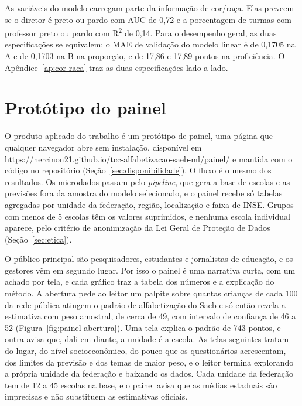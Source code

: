 

As variáveis do modelo carregam parte da informação de cor/raça. Elas
preveem se o diretor é preto ou pardo com AUC de 0,72 e a porcentagem de
turmas com professor preto ou pardo com R\textsuperscript{2} de 0,14. Para o desempenho
geral, as duas especificações se equivalem: o MAE de validação do modelo
linear é de 0,1705 na A e de 0,1703 na B na proporção, e de 17,86 e 17,89
pontos na proficiência. O Apêndice~\ref{ap:cor-raca} traz as duas
especificações lado a lado.

\section{Protótipo do painel}
\label{sec:painel}

O produto aplicado do trabalho é um protótipo de painel, uma página que
qualquer navegador abre sem instalação, disponível em
\url{https://nercinon21.github.io/tcc-alfabetizacao-saeb-ml/painel/} e
mantida com o código no repositório (Seção~\ref{sec:disponibilidade}). O fluxo é o mesmo dos
resultados. Os microdados passam pelo \textit{pipeline}, que gera a base
de escolas e as previsões fora da amostra do modelo selecionado, e o
painel recebe só tabelas agregadas por unidade da federação, região,
localização e faixa de INSE. Grupos com menos de 5 escolas têm os valores
suprimidos, e nenhuma escola individual aparece, pelo critério de
anonimização da Lei Geral de Proteção de Dados (Seção~\ref{sec:etica}).

O público principal são pesquisadores, estudantes e jornalistas de
educação, e os gestores vêm em segundo lugar. Por isso o painel é uma
narrativa curta, com um achado por tela, e cada gráfico traz a tabela dos
números e a explicação do método. A abertura pede ao leitor um palpite
sobre quantas crianças de cada 100 da rede pública atingem o padrão de
alfabetização do Saeb e só então revela a estimativa com peso amostral,
de cerca de 49, com intervalo de confiança de 46 a 52
(Figura~\ref{fig:painel-abertura}). Uma tela explica o padrão de 743
pontos, e outra avisa que, dali em diante, a unidade é a escola. As telas seguintes tratam do lugar,
do nível socioeconômico, do pouco que os questionários acrescentam, dos
limites da previsão e dos temas de maior peso, e o leitor termina
explorando a própria unidade da federação e baixando os dados. Cada
unidade da federação tem de 12 a 45 escolas na base, e o painel avisa que
as médias estaduais são imprecisas e não substituem as estimativas
oficiais.

